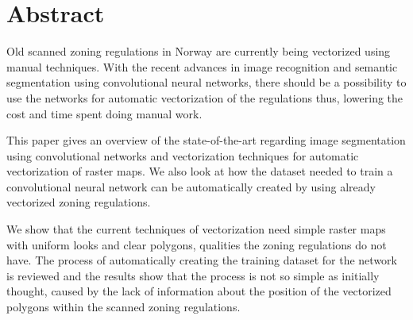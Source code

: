 \section*{Abstract}
Old scanned zoning regulations in Norway are currently being vectorized using manual techniques. With the recent advances in image recognition and semantic segmentation using convolutional neural networks, there should be a possibility to use the networks for automatic vectorization of the regulations thus, lowering the cost and time spent doing manual work.

This paper gives an overview of the state-of-the-art regarding image segmentation using convolutional networks and vectorization techniques for automatic vectorization of raster maps. We also look at how the dataset needed to train a convolutional neural network can be automatically created by using already vectorized zoning regulations.

We show that the current techniques of vectorization need simple raster maps with uniform looks and clear polygons, qualities the zoning regulations do not have. The process of automatically creating the training dataset for the network is reviewed and the results show that the process is not so simple as initially thought, caused by the lack of information about the position of the vectorized polygons within the scanned zoning regulations.
